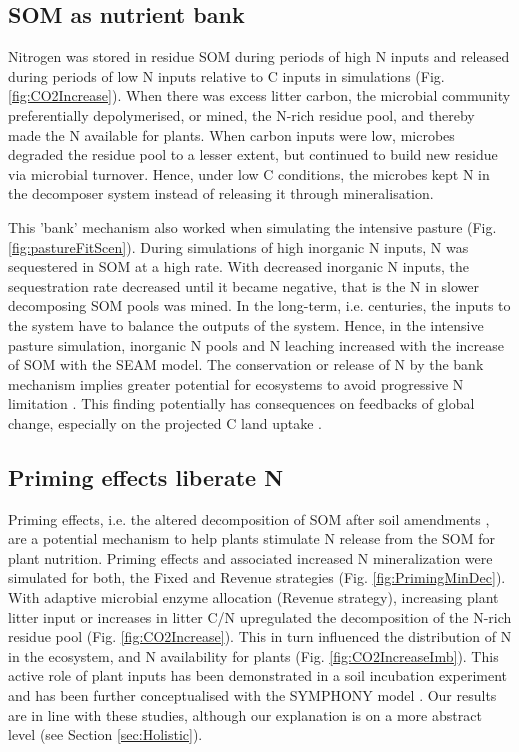 \subsection{SOM as nutrient bank}
Nitrogen was stored in residue SOM during periods of high N inputs and released
during periods of low N inputs relative to C inputs in simulations (Fig.
\ref{fig:CO2Increase}). When there was excess litter carbon, the microbial
community preferentially depolymerised, or mined, the N-rich residue pool, and thereby
made the N available for plants. When carbon inputs were low, microbes degraded
the residue pool to a lesser extent, but continued to build new residue via
microbial turnover. Hence, under low C conditions, the microbes kept N in the
decomposer system instead of releasing it through mineralisation.

This 'bank' mechanism \citep[sensu][]{Perveen14} also worked when simulating the
intensive pasture (Fig. \ref{fig:pastureFitScen}). During simulations of high
inorganic N inputs, N was sequestered in SOM at a high rate. With decreased
inorganic N inputs, the sequestration rate decreased until it became negative,
that is the N in slower decomposing SOM pools was mined. In the
long-term, i.e.
centuries, the inputs to the system have to balance the outputs of the system. Hence, in
the intensive pasture simulation, inorganic N pools and N leaching increased with
the increase of SOM with the SEAM model. The conservation or release of N by the
bank mechanism implies greater potential for ecosystems to avoid progressive N
limitation \citep{Norby10, Franklin14, Averill15}. This finding
potentially has consequences on feedbacks of global change, especially on the
projected C land uptake \citep{Friedlingstein14}.

\subsection{Priming effects liberate N}
Priming effects, i.e. the altered decomposition of SOM after soil amendments
\citep{Kuzyakov00}, are a potential mechanism to help plants stimulate N release
from the SOM for plant nutrition.
Priming effects and associated increased N mineralization were simulated for
both, the Fixed and Revenue strategies (Fig. \ref{fig:PrimingMinDec}). With
adaptive microbial enzyme allocation (Revenue strategy), increasing
plant litter input or increases in litter C/N upregulated
the decomposition of the N-rich residue pool (Fig.
\ref{fig:CO2Increase}).
This in turn influenced the distribution of N in the ecosystem, and N
availability for plants (Fig.
\ref{fig:CO2IncreaseImb}). This active role of plant inputs has been
demonstrated in a soil incubation experiment \citep{Fontaine11} and has been
further conceptualised with the SYMPHONY model \citep{Perveen14}. Our results
are in line with these studies, although our explanation is on a more abstract
level (see Section \ref{sec:Holistic}). 

